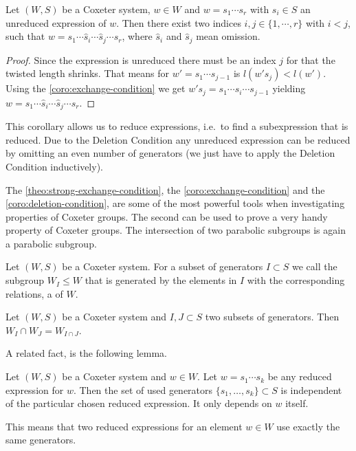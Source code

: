 \begin{coro}
	Let $(W,S)$ be a Coxeter system, $w \in W$ and $w = s_1 \cdots s_r$ with $s_i \in S$ an unreduced expression of $w$. Then there exist two indices $i,j \in \{1,\cdots,r\}$ with $i < j$, such that $w = s_1 \cdots \hat s_i \cdots \hat s_j \cdots s_r$, where $\hat s_i$ and $\hat s_j$ mean omission.

	\begin{proof}
		Since the expression is unreduced there must be an index $j$ for that the twisted length shrinks. That means for $w' = s_1 \cdots s_{j-1}$ is $l(w' s_j) < l(w')$. Using the \ref{coro:exchange-condition} we get $w' s_j = s_1 \cdots \hat s_i \cdots s_{j-1}$ yielding $w = s_1 \cdots \hat s_i \cdots \hat s_j \cdots s_r$.
	\end{proof}
\end{coro}

This corollary allows us to reduce expressions, i.e.\ to find a subexpression that is reduced. Due to the Deletion Condition any unreduced expression can be reduced by omitting an even number of generators (we just have to apply the Deletion Condition inductively).

The \ref{theo:strong-exchange-condition}, the \ref{coro:exchange-condition} and the \ref{coro:deletion-condition}, are some of the most powerful tools when investigating properties of Coxeter groups. The second can be used to prove a very handy property of Coxeter groups. The intersection of two parabolic subgroups is again a parabolic subgroup.

\begin{defi}
	Let $(W,S)$ be a Coxeter system. For a subset of generators $I \subset S$ we call the subgroup $W_I \leq W$ that is generated by the elements in $I$ with the corresponding relations, a  of $W$.
\end{defi}

\begin{lemm}
	Let $(W,S)$ be a Coxeter system and $I,J \subset S$ two subsets of generators. Then ${W_I \cap W_J} = W_{I \cap J}$.
\end{lemm}

A related fact, is the following lemma.

\begin{lemm}
	Let $(W,S)$ be a Coxeter system and $w \in W$. Let $w = s_1 \cdots s_k$ be any reduced expression for $w$. Then the set of used generators $\{s_1, \ldots, s_k\} \subset S$ is independent of the particular chosen reduced expression. It only depends on $w$ itself.
\end{lemm}

This means that two reduced expressions for an element $w \in W$ use exactly the same generators.